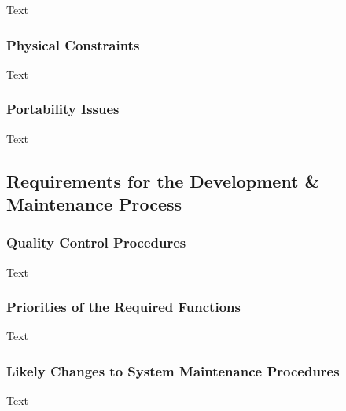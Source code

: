 \documentclass[12pt]{article}
\begin{document}
Text

\subsubsection {Physical Constraints}

Text

\subsubsection {Portability Issues}

Text

\subsection{Requirements for the Development & Maintenance Process}

\subsubsection {Quality Control Procedures}

Text

\subsubsection {Priorities of the Required Functions}

Text

\subsubsection {Likely Changes to System Maintenance Procedures}

Text
\end{document}
